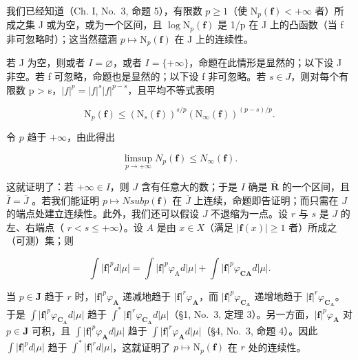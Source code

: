 我们已经知道（Ch. I, No.~3, 命题 5），有限数 \(p \geqslant 1\)（使 \(\mathrm{N}_{p}(\mathbf{f}) < +\infty\) 者）所成之集 J 或为空，或为一个区间，且 \(\log \mathrm{N}_{p}(\mathbf{f})\) 是 1/p 在 J 上的凸函数（当 f 非可忽略时）；这当然蕴涵 \(p \mapsto \mathrm{N}_{p}(\mathbf{f})\) 在 J 上的连续性。

若 J 为空，则或者 \(I = \varnothing\)，或者 \(I = \{+\infty\}\)，命题在此情形是显然的；以下设 J 非空。若 f 可忽略，命题也是显然的；以下设 f 非可忽略。若 \(s \in J\)，则对每个有限数 p \textgreater{} s，\(|f|^{p} = |f|^{s}|f|^{p-s}\)，且平均不等式表明

\[
\mathrm{N} _ {p} (\mathbf {f}) \leqslant \left(\mathrm{N} _ {s} (\mathbf {f})\right) ^ {s / p} \left(\mathrm{N} _ {\infty} (\mathbf {f})\right) ^ {(p - s) / p}.\tag{12}
\]

令 \(p\) 趋于 \(+\infty\)，由此得出

\[
\limsup _ {p \to + \infty} N _ {p} (\mathbf {f}) \leqslant N _ {\infty} (\mathbf {f})  .\tag{13}
\]

这就证明了：若 \(+\infty \in I\)，则 \(J\) 含有任意大的数；于是 \(I\) 确是 \(\overline{\mathbf{R}}\) 的一个区间，且 \(\overline{I} = \overline{J}\) 。若我们能证明 \(p \mapsto N sub p(\mathbf{f})\) 在 \(\overline{J}\) 上连续，命题即告证明；而只需在 \(J\) 的端点处建立连续性。此外，我们还可以假设 \(J\) 不退缩为一点。设 \(r\) 与 \(s\) 是 \(J\) 的左、右端点（ \(r < s \leqslant +\infty\)）。设 \(A\) 是由 \(x \in X\)（满足 \(|\mathbf{f}(x)| \geqslant 1\) 者）所成之（可测）集；则

\[
\int | \mathbf {f} | ^ {p} d | \mu | = \int | \mathbf {f} | ^ {p} \varphi_ {\mathrm{A}} d | \mu | + \int | \mathbf {f} | ^ {p} \varphi_ {\mathbf {C A}} d | \mu |.
\]

当 \(p \in \mathbf{J}\) 趋于 \(r\) 时，\(|\mathbf{f}|^p\varphi_{\mathbf{A}}\) 递减地趋于 \(|\mathbf{f}|^r\varphi_{\mathbf{A}}\)，而 \(|\mathbf{f}|^p\varphi_{\mathbf{C}_{\mathbf{A}}}\) 递增地趋于 \(|\mathbf{f}|^r\varphi_{\mathbf{C}_{\mathbf{A}}}\)。于是 \(\int |\mathbf{f}|^p\varphi_{\mathbf{C}_{\mathbf{A}}}d|\mu|\) 趋于 \(\int^{*}|\mathbf{f}|^{r}\varphi_{\mathbf{C}_{\mathbf{A}}}d|\mu|\)（§1, No.~3, 定理 3）。另一方面，\(|\mathbf{f}|^p\varphi_{\mathbf{A}}\) 对 \(p \in \mathbf{J}\) 可积，且 \(\int |\mathbf{f}|^p\varphi_{\mathbf{A}}d|\mu|\) 趋于 \(\int |\mathbf{f}|^r\varphi_{\mathbf{A}}d|\mu|\)（§4, No.~3, 命题 4）。因此 \(\int |\mathbf{f}|^p d|\mu|\) 趋于 \(\int^{*}|\mathbf{f}|^{r}d|\mu|\)，这就证明了 \(p \mapsto \mathrm{N}_p(\mathbf{f})\) 在 \(r\) 处的连续性。

